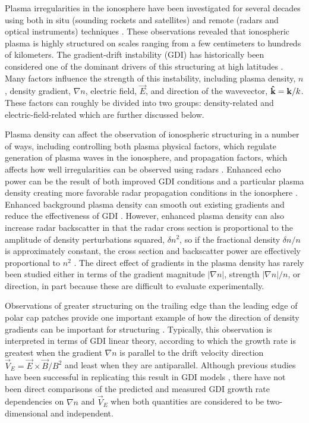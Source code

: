 Plasma irregularities in the ionosphere have been investigated for several decades using both in situ (sounding rockets and satellites) and remote (radars and optical instruments) techniques \citep[e.g. a comprehensive review by][]{Fejer1980}.  These observations revealed that ionospheric plasma is highly structured on scales ranging from a few centimeters to hundreds of kilometers.  The gradient-drift instability (GDI) has historically been considered one of the dominant drivers of this structuring at high latitudes \citep{Tsunoda1988}.  Many factors influence the strength of this instability, including plasma density, \(n\), density gradient, \(\nabla n\), electric field, \(\vec{E}\), and direction of the wavevector, \(\mathbf{\hat{k}}=\mathbf{k}/k\).  These factors can roughly be divided into two groups: density-related and electric-field-related which are further discussed below.

Plasma density can affect the observation of ionospheric structuring in a number of ways, including controlling both plasma physical factors, which regulate generation of plasma waves in the ionosphere, and propagation factors, which affects how well irregularities can be observed using radars \citep[e.g.][]{Danskin2002,Koustov2004,Lamarche2015}.  Enhanced echo power can be the result of both improved GDI conditions and a particular plasma density creating more favorable radar propagation conditions in the ionosphere  \citep[e.g.][]{Koustov2012}.  Enhanced background plasma density can smooth out existing gradients and reduce the effectiveness of GDI \citep{Ruohoniemi1997}.  However, enhanced plasma density can also increase radar backscatter in that the radar cross section is proportional to the amplitude of density perturbations squared, \(\delta n^2\), so if the fractional density \(\delta n/n\) is approximately constant, the cross section and backscatter power are effectively proportional to \(n^2\) \citep{Makarevich2014b}.  The direct effect of gradients in the plasma density has rarely been studied either in terms of the gradient magnitude \(\lvert\nabla n\rvert\), strength \(\lvert\nabla n\rvert/n\), or direction, in part because these are difficult to evaluate experimentally.

Observations of greater structuring on the trailing edge than the leading edge of polar cap patches provide one important example of how the direction of density gradients can be important for structuring \citep[e.g.][]{Weber1984,Milan2002b,Koustov2012,Moen2012}. Typically, this observation is interpreted in terms of GDI linear theory, according to which the growth rate is greatest when the gradient \(\nabla n\) is parallel to the drift velocity direction \(\vec{V}_E = \vec{E}\times\vec{B}/B^2\) and least when they are antiparallel.  Although previous studies have been successful in replicating this result in GDI models \citep{Gondarenko2004b,Gondarenko2006}, there have not been direct comparisons of the predicted and measured GDI growth rate dependencies on \(\nabla n\) and \(\vec{V}_E\) when both quantities are considered to be two-dimensional and independent.

